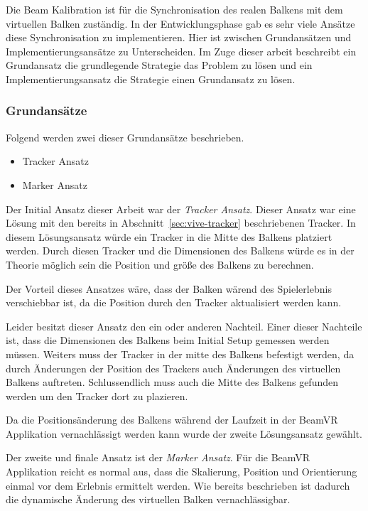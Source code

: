 Die Beam Kalibration ist für die Synchronisation des realen Balkens mit dem virtuellen Balken zuständig.
In der Entwicklungsphase gab es sehr viele Ansätze diese Synchronisation zu implementieren.
Hier ist zwischen Grundansätzen und Implementierungsansätze zu Unterscheiden.
Im Zuge dieser arbeit beschreibt ein Grundansatz die grundlegende Strategie das Problem zu lösen und ein Implementierungsansatz die Strategie einen Grundansatz zu lösen.

\subsubsection{Grundansätze}

Folgend werden zwei dieser Grundansätze beschrieben.

\begin{itemize}
    \item Tracker Ansatz
    \item Marker Ansatz
\end{itemize}

Der Initial Ansatz dieser Arbeit war der \emph{Tracker Ansatz}.
Dieser Ansatz war eine Lösung mit den bereits in Abschnitt~\ref{sec:vive-tracker} beschriebenen Tracker.
In diesem Lösungsansatz würde ein Tracker in die Mitte des Balkens platziert werden.
Durch diesen Tracker und die Dimensionen des Balkens würde es in der Theorie möglich sein die Position und größe des Balkens zu berechnen.

Der Vorteil dieses Ansatzes wäre, dass der Balken wärend des Spielerlebnis verschiebbar ist, da die Position durch den Tracker aktualisiert werden kann.

Leider besitzt dieser Ansatz den ein oder anderen Nachteil.
Einer dieser Nachteile ist, dass die Dimensionen des Balkens beim Initial Setup gemessen werden müssen.
Weiters muss der Tracker in der mitte des Balkens befestigt werden, da durch Änderungen der Position des Trackers auch Änderungen des virtuellen Balkens auftreten.
Schlussendlich muss auch die Mitte des Balkens gefunden werden um den Tracker dort zu plazieren.

Da die Positionsänderung des Balkens während der Laufzeit in der BeamVR Applikation vernachlässigt werden kann wurde der zweite Lösungsansatz gewählt.

Der zweite und finale Ansatz ist der \emph{Marker Ansatz}.
Für die BeamVR Applikation reicht es normal aus, dass die Skalierung, Position und Orientierung einmal vor dem Erlebnis ermittelt werden.
Wie bereits beschrieben ist dadurch die dynamische Änderung des virtuellen Balken vernachlässigbar.

